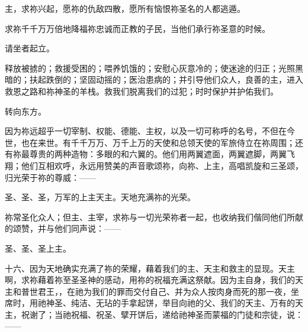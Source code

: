 主，求祢兴起，愿祢的仇敌四散，愿所有恼恨祢圣名的人都逃遁。\par

求祢千千万万倍地降福祢忠诚而正教的子民，当他们承行祢圣意的时候。\par

\par

请坐者起立。\par

\par

释放被掳的；救援受困的；喂养饥饿的；安慰心灰意冷的；使迷途的归正；光照黑暗的；扶起跌倒的；坚固动摇的；医治患病的；并引导他们众人，良善的主，进入救恩之路和祢神圣的羊栈。救我们脱离我们的过犯；时时保护并护佑我们。\par

\par

转向东方。\par

\par

因为祢远超乎一切宰制、权能、德能、主权，以及一切可称呼的名号，不但在今世，也在来世。有千千万万、万千上万的天使和总领天使的军旅侍立在祢周围；还有祢最尊贵的两种造物：多眼的和六翼的。他们用两翼遮面，两翼遮脚，两翼飞翔；他们互相欢呼，永远用赞美的声音歌颂祢，向祢、上主，高唱凯旋和三圣颂，归光荣于祢的尊威：——\par

圣、圣、圣，万军的上主天主。天地充满祢的光荣。\par

\par

祢常圣化众人；但主、主宰，求祢与一切光荣祢者一起，也收纳我们偕同他们所献的颂赞，并与他们同声说：——\par

\par

圣、圣、圣上主。\par

\par

十六、因为天地确实充满了祢的荣耀，藉着我们的主、天主和救主的显现。天主啊，求祢藉着祢至圣圣神的感动，用祢的祝福充满这祭献。因为主自身，我们的天主和普世君王，，在祂为我们的罪而交付自己、并为众人按肉身而死的那一夜，坐席时，用祂神圣、纯洁、无玷的手拿起饼，举目向祂的父、我们的天主、万有的天主，祝谢了；当祂祝福、祝圣、擘开饼后，递给祂神圣而蒙福的门徒和宗徒，说：——\par

